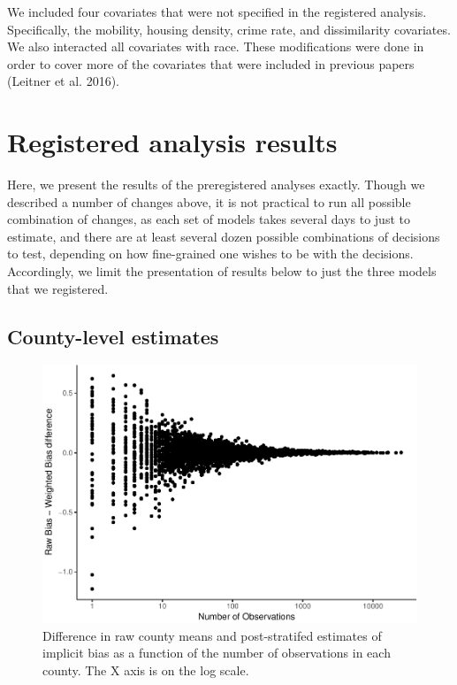 \documentclass[]{article}
\theoremstyle{definition}
\theoremstyle{definition}
\theoremstyle{remark}
\begin{document}
We included four covariates that were not specified in the registered
analysis. Specifically, the mobility, housing density, crime rate, and
dissimilarity covariates. We also interacted all covariates with race.
These modifications were done in order to cover more of the covariates
that were included in previous papers (Leitner et al. 2016).

\section{Registered analysis results}\label{registered-analysis-results}

Here, we present the results of the preregistered analyses exactly.
Though we described a number of changes above, it is not practical to
run all possible combination of changes, as each set of models takes
several days to just to estimate, and there are at least several dozen
possible combinations of decisions to test, depending on how
fine-grained one wishes to be with the decisions. Accordingly, we limit
the presentation of results below to just the three models that we
registered.

\subsection{County-level estimates}\label{county-level-estimates}

\begin{figure}
\centering
\includegraphics{osf_supplement_files/figure-latex/raw-county-estimates-1.pdf}
\caption{\label{fig:raw-county-estimates}\label{fig:raw-county-estimates}Difference
in raw county means and post-stratifed estimates of implicit bias as a
function of the number of observations in each county. The X axis is on
the log scale.}
\end{figure}
\end{document}
